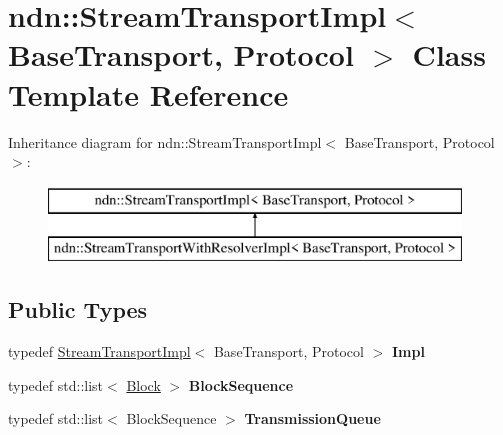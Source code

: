 \hypertarget{classndn_1_1StreamTransportImpl}{}\section{ndn\+:\+:Stream\+Transport\+Impl$<$ Base\+Transport, Protocol $>$ Class Template Reference}
\label{classndn_1_1StreamTransportImpl}
Inheritance diagram for ndn\+:\+:Stream\+Transport\+Impl$<$ Base\+Transport, Protocol $>$\+:\begin{figure}[H]
\begin{center}
\leavevmode
\includegraphics[height=2.000000cm]{classndn_1_1StreamTransportImpl}
\end{center}
\end{figure}
\subsection*{Public Types}
\begin{DoxyCompactItemize}
\item 
typedef \hyperlink{classndn_1_1StreamTransportImpl}{Stream\+Transport\+Impl}$<$ Base\+Transport, Protocol $>$ {\bfseries Impl}\hypertarget{classndn_1_1StreamTransportImpl_a138bb46f364a7bc7db0f2d0691529196}{}\label{classndn_1_1StreamTransportImpl_a138bb46f364a7bc7db0f2d0691529196}

\item 
typedef std\+::list$<$ \hyperlink{classndn_1_1Block}{Block} $>$ {\bfseries Block\+Sequence}\hypertarget{classndn_1_1StreamTransportImpl_a36c9079f49f9a194cccb6c1f0a79803a}{}\label{classndn_1_1StreamTransportImpl_a36c9079f49f9a194cccb6c1f0a79803a}

\item 
typedef std\+::list$<$ Block\+Sequence $>$ {\bfseries Transmission\+Queue}\hypertarget{classndn_1_1StreamTransportImpl_afdca3b6b21361e136fa9b364124d5606}{}\label{classndn_1_1StreamTransportImpl_afdca3b6b21361e136fa9b364124d5606}

\end{DoxyCompactItemize}
